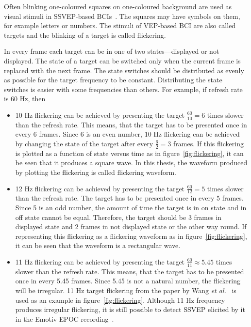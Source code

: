 Often blinking one-coloured squares on one-coloured background are used as visual stimuli in \gls{SSVEP}-based \glspl{BCI}~\cite{ssvep_stim}. The squares may have symbols on them, for example letters or numbers. The stimuli of \gls{VEP}-based \gls{BCI} are also called \glspl{target} and the blinking of a \gls{target} is called \gls{flickering}.

In every \gls{frame} each \gls{target} can be in one of two \glspl{state}---displayed or not displayed. The \gls{state} of a \gls{target} can be switched only when the current \gls{frame} is replaced with the next \gls{frame}. The \gls{state} switches should be distributed as evenly as possible for the target frequency to be constant. Distributing the \gls{state} switches is easier with some frequencies than others. For example, if \gls{refresh rate} is 60 Hz, then
\begin{itemize}
	\item 10 Hz \gls{flickering} can be achieved by presenting the \gls{target} $\frac{60}{10}=6$ times slower than the \gls{refresh rate}. This means, that the \gls{target} has to be presented once in every 6 \glspl{frame}. Since 6 is an even number, 10 Hz \gls{flickering} can be achieved by changing the \gls{state} of the \gls{target} after every $\frac{6}{2} = 3$ \glspl{frame}. If this \gls{flickering} is plotted as a function of \gls{state} versus time as in figure~\ref{fig:flickering}, it can be seen that it produces a \gls{square wave}. In this thesis, the waveform produced by plotting the \gls{flickering} is called \gls{flickering waveform}.
	\item 12 Hz \gls{flickering} can be achieved by presenting the \gls{target} $\frac{60}{12}=5$ times slower than the \gls{refresh rate}. The \gls{target} has to be presented once in every 5 \glspl{frame}. Since 5 is an odd number, the amount of time the target is in on \gls{state} and in off \gls{state} cannot be equal. Therefore, the \gls{target} should be 3 \glspl{frame} in displayed \gls{state} and 2 \glspl{frame} in not displayed \gls{state} or the other way round. If representing this \gls{flickering} as a \gls{flickering waveform} as in figure~\ref{fig:flickering}, it can be seen that the waveform is a \gls{rectangular wave}.
	\item 11 Hz \gls{flickering} can be achieved by presenting the \gls{target} $\frac{60}{11}\approx 5.45$ times slower than the \gls{refresh rate}. This means, that the \gls{target} has to be presented once in every 5.45 \glspl{frame}. Since 5.45 is not a natural number, the \gls{flickering} will be irregular. 11 Hz target \gls{flickering} from the paper by Wang \textit{et al.}~\cite{11hz} is used as an example in figure~\ref{fig:flickering}. Although 11 Hz frequency produces irregular \gls{flickering}, it is still possible to detect \gls{SSVEP} elicited by it in the Emotiv EPOC recording~\cite{emotiv_11hz}.
\end{itemize}


